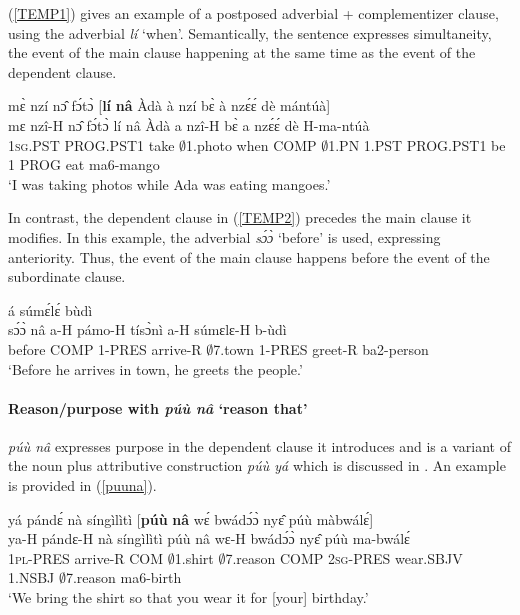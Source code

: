 (\ref{TEMP1}) gives an example of a postposed adverbial + complementizer clause, using the adverbial {\itshape lí} `when'. Semantically, the sentence expresses simultaneity, the event of the main clause happening at the same time as the event of the dependent clause.

\begin{exe}
\ex\label{TEMP1}
  \glll mɛ̀ nzí nɔ̂ fɔ́tɔ̀ [{\bfseries lí} {\bfseries nâ} Àdà à nzí bɛ̀ à nzɛ́ɛ́ dè mántúà]  \\
        mɛ nzî-H nɔ̂ fɔ́tɔ̀ lí nâ Àdà a nzî-H bɛ̀ a nzɛ́ɛ́ dè H-ma-ntúà  \\
         1\textsc{sg}.PST PROG.PST1 take $\emptyset$1.photo when COMP $\emptyset$1.PN 1.PST PROG.PST1 be 1 PROG eat ma6-mango \\ 
    \trans `I was taking photos while Ada was eating mangoes.'
\end{exe}

In contrast, the dependent clause in (\ref{TEMP2}) precedes the main clause it modifies. In this example, the adverbial {\itshape sɔ́ɔ̀} `before' is used, expressing anteriority. Thus, the event of the main clause happens before the event of the subordinate clause.

\begin{exe}
\ex\label{TEMP2}
   á súmɛ́lɛ́ bùdì  \\
        sɔ́ɔ̀ nâ a-H pámo-H tísɔ̀nì a-H súmɛlɛ-H b-ùdì  \\
         before COMP 1-PRES arrive-R $\emptyset$7.town 1-PRES greet-R ba2-person \\ 
    \trans `Before he arrives in town, he greets the people.'
\end{exe}

\paragraph{Reason/purpose with {\itshape púù nâ} `reason that'}
{\itshape púù nâ} expresses purpose in the dependent clause it introduces and is a variant of the noun plus attributive construction {\itshape púù yá} which is discussed in .  An example is provided in (\ref{puuna}).

\begin{exe}
\ex\label{puuna} 
  \glll  yá pándɛ́ nà síngìlìtì [{\bfseries púù} {\bfseries nâ} wɛ́ bwádɔ́ɔ̀ nyɛ̂ púù màbwálɛ́] \\
         ya-H pándɛ-H nà síngìlìtì púù nâ wɛ-H bwádɔ́ɔ̀ nyɛ̂ púù ma-bwálɛ́ \\
         1\textsc{pl}-PRES arrive-R COM $\emptyset$1.shirt $\emptyset$7.reason COMP 2\textsc{sg}-PRES wear.SBJV 1.NSBJ $\emptyset$7.reason ma6-birth\\
    \trans `We bring the shirt so that you wear it for [your] birthday.'
\end{exe}

